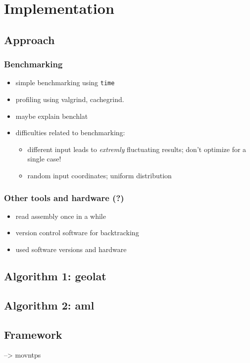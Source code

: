 \section{Implementation}
\subsection{Approach}
\subsubsection{Benchmarking}
\begin{itemize}
\item simple benchmarking using \texttt{time}
\item profiling using valgrind, cachegrind.
\item maybe explain benchlat
\item difficulties related to benchmarking:
\begin{itemize}
\item different input leads to \emph{extremly} fluctuating results; don't optimize for a single case!
\item random input coordinates; uniform distribution
\end{itemize}
\end{itemize}
\subsubsection{Other tools and hardware (?)}
\begin{itemize}
\item read assembly once in a while 
\item version control software for backtracking
\item used software versions and hardware
\end{itemize}
\subsection{Algorithm 1: geolat}
\subsection{Algorithm 2: aml}
\subsection{Framework}
--> movntps